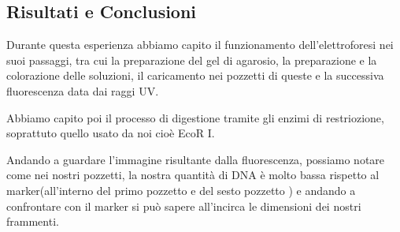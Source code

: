 \subsection{Risultati e Conclusioni}

Durante questa esperienza abbiamo capito il funzionamento dell'elettroforesi nei suoi passaggi, tra cui la preparazione del gel di agarosio, la preparazione e la colorazione delle soluzioni, il caricamento nei pozzetti di queste e la successiva fluorescenza data dai raggi UV.

Abbiamo capito poi il processo di digestione tramite gli enzimi di restriozione, soprattuto quello usato da noi cioè EcoR I.

Andando a guardare l'immagine risultante dalla fluorescenza, possiamo notare come nei nostri pozzetti, la nostra quantità di DNA è molto bassa rispetto al marker(all'interno del primo pozzetto e del sesto pozzetto ) e andando a confrontare con il marker si può sapere all'incirca le dimensioni dei nostri frammenti.
